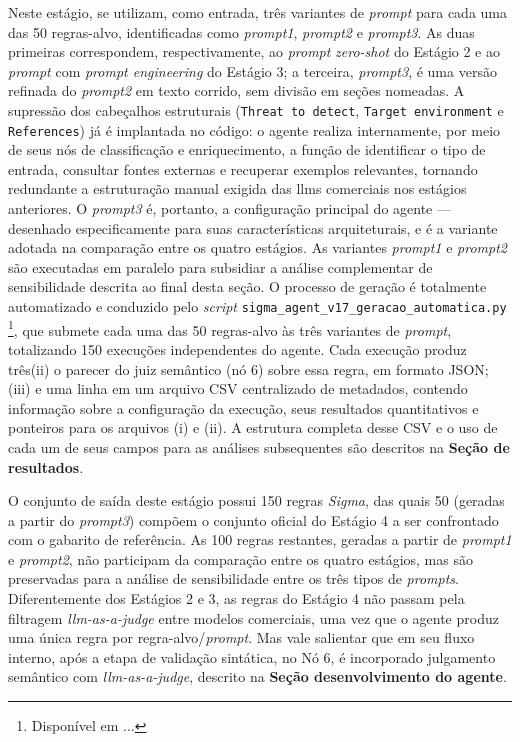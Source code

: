 Neste estágio, se utilizam, como entrada, três variantes de \textit{prompt} para cada uma das 50 regras-alvo, identificadas como \textit{prompt1}, \textit{prompt2} e \textit{prompt3}. 
As duas primeiras correspondem, respectivamente, ao \textit{prompt} \textit{zero-shot} do Estágio 2 e ao \textit{prompt} com \textit{prompt engineering} do Estágio 3; 
a terceira, \textit{prompt3}, é uma versão refinada do \textit{prompt2} em texto corrido, sem divisão em seções nomeadas. 
A supressão dos cabeçalhos estruturais (\texttt{Threat to detect}, \texttt{Target environment} e \texttt{References}) já é implantada no código: o agente realiza internamente, por meio de seus nós de classificação e enriquecimento, a função de identificar o tipo de entrada, consultar fontes externas e recuperar exemplos relevantes, tornando redundante a estruturação manual exigida das \gls{llm}s comerciais nos estágios anteriores. 
O \textit{prompt3} é, portanto, a configuração principal do agente --- desenhado especificamente para suas características arquiteturais, e é a variante adotada na comparação entre os quatro estágios. 
As variantes \textit{prompt1} e \textit{prompt2} são executadas em paralelo para subsidiar a análise complementar de sensibilidade descrita ao final desta seção.
O processo de geração é totalmente automatizado e conduzido pelo \textit{script} \texttt{sigma\_agent\_v17\_geracao\_automatica.py}
\footnote{Disponível em ...}, 
que submete cada uma das 50 regras-alvo às três variantes de \textit{prompt}, totalizando 150 execuções independentes do agente. 
Cada execução produz três(ii) o parecer do juiz semântico (nó 6) sobre essa regra, em formato JSON; (iii) e uma linha em um arquivo CSV centralizado de metadados, contendo informação sobre a configuração da execução, seus resultados quantitativos e ponteiros para os arquivos (i) e (ii). 
A estrutura completa desse CSV e o uso de cada um de seus campos para as análises subsequentes são descritos na \textbf{Seção de resultados}.

O conjunto de saída deste estágio possui 150 regras \textit{Sigma}, das quais 50 (geradas a partir do \textit{prompt3}) compõem o conjunto oficial do Estágio 4 a ser confrontado com o gabarito de referência. 
As 100 regras restantes, geradas a partir de \textit{prompt1} e \textit{prompt2}, não participam da comparação entre os quatro estágios, mas são preservadas para a análise de sensibilidade entre os três tipos de \textit{prompts}. 
Diferentemente dos Estágios 2 e 3, as regras do Estágio 4 não passam pela filtragem \textit{\gls{llm}-as-a-judge} entre modelos comerciais, uma vez que o agente produz uma única regra por regra-alvo/\textit{prompt}. 
Mas vale salientar que em seu fluxo interno, após a etapa de validação sintática, no Nó 6, é incorporado julgamento semântico com \textit{\gls{llm}-as-a-judge}, descrito na \textbf{Seção desenvolvimento do agente}.

